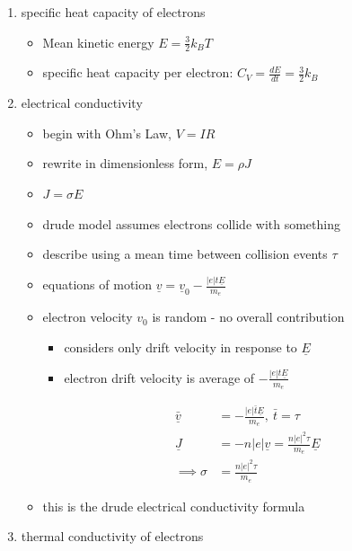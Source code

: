 \documentclass[a4paper,11pt,normalem]{article}
\begin{document}
\begin{enumerate}
    \item specific heat capacity of electrons
        \begin{itemize}
            \item Mean kinetic energy \(E = \frac{3}{2}k_BT\)
            \item specific heat capacity per electron: \(C_V = \frac{dE}{dt} = \frac{3}{2}k_B\)
        \end{itemize}
    \item electrical conductivity
        \begin{itemize}
            \item begin with Ohm's Law, \(V = IR\)
            \item rewrite in dimensionless form, \(E = \rho J\)
            \item \(J = \sigma E\)
            \item drude model assumes electrons collide with something
            \item describe using a mean time between collision events \(\tau\)
            \item equations of motion \(\underline{v} = \underline{v}_0 - \frac{|e|t\underline{E}}{m_e}\)
            \item electron velocity \(v_0\) is random - no overall contribution
                \begin{itemize}
                    \item considers only drift velocity in response to \(\underline{E}\)
                    \item electron drift velocity is average of \(-\frac{|e|t\underline{E}}{m_e}\)
                 \end{itemize}
                \begin{align*}
                    \bar{\underline{v}} &= -\frac{|e|\bar{t}\underline{E}}{m_e},~ \bar{t} = \tau \\
                    \underline{J} &= -n|e|\underline{v} = \frac{n|e|^2\tau}{m_e}\underline{E} \\
                    \implies \sigma &= \frac{n|e|^2\tau}{m_e}
                \end{align*}
            \item this is the drude electrical conductivity formula
        \end{itemize}
    \item thermal conductivity of electrons
        \begin{itemize}

\end{itemize}
\end{enumerate}
\end{document}
